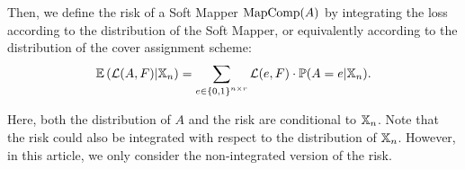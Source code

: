 \noindent Then, we define the risk of a Soft Mapper $\text{MapComp}(A)$ by integrating the loss according to the distribution of the Soft Mapper, or equivalently according to the distribution of the cover assignment scheme: 
$$\mathbb{E} \left( \mathcal{L}(A,F) | \mathbb{X}_n\right)=\sum_{e\in {\{0,1\}}^{n\times r}}\mathcal{L}(e,F)\cdot\mathbb{P}(A=e |\mathbb{X}_n).$$
\noindent

Here, %
both the distribution of $A$ and the risk are conditional to $\mathbb{X}_n$. 
Note that the risk could also be integrated with respect to the distribution  of $\mathbb{X}_n$. However, in this article, we only consider the non-integrated version of the risk. 
